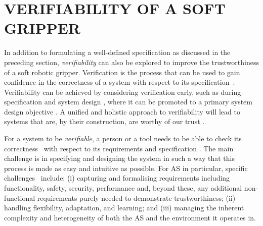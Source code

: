 \documentclass[letterpaper, 10 pt, conference]{ieeeconf}  %
\begin{document}
	\section{VERIFIABILITY OF A SOFT GRIPPER} \label{verifiability}
	In addition to formulating a well-defined specification as discussed in the preceding section, \emph{verifiability} can also be explored to improve the trustworthiness of a soft robotic gripper. 
	Verification is the process that can be used to gain confidence in the correctness of a system with respect to its specification~\cite{Bergeron2000}. 
	Verifiability can be achieved by considering verification early, such as during specification and system design \cite{Mousavi2022}, where it can be promoted to a primary system design objective \cite{Eder2021}.
	A unified and holistic approach to verifiability will lead to systems that are, by their construction, are worthy of our trust \cite{Mousavi2022}. 
	
	For a system to be {\em verifiable\/}, a person or a tool needs to be able to check its correctness~\cite{ISO24765:2017} with respect to its requirements and specification \cite{Abeywickrama2022}. 
	The main challenge is in specifying and designing the system in such a way that this process is made as easy and intuitive as possible.
	For AS in particular, specific challenges~\cite{Abeywickrama2022} include: 
	(i) capturing and formalising requirements including functionality, safety, security, performance and, beyond these, any additional non-functional requirements purely needed to demonstrate trustworthiness; 
	(ii) handling flexibility, adaptation, and learning; and 
	(iii) managing the inherent complexity and heterogeneity of both the AS and the environment it operates in. 
	
\end{document}

